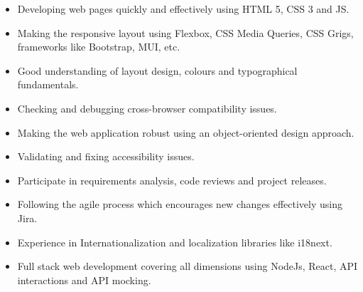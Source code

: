 %
%
%

{\begin{itemize}
    \item Developing web pages quickly and effectively using HTML 5, CSS 3 and JS.
    \item Making the responsive layout using Flexbox, CSS Media Queries, CSS Grigs, frameworks like Bootstrap, MUI, etc.
    \item Good understanding of layout design, colours and typographical fundamentals.
    \item Checking and debugging cross-browser compatibility issues.
    \item Making the web application robust using an object-oriented design approach.
    \item Validating and fixing accessibility issues.
    \item Participate in requirements analysis, code reviews and project releases.
    \item Following the agile process which encourages new changes effectively using Jira.
    \item Experience in Internationalization and localization libraries like i18next.
    \item Full stack web development covering all dimensions using NodeJs, React, API interactions and API mocking.
\end{itemize}}